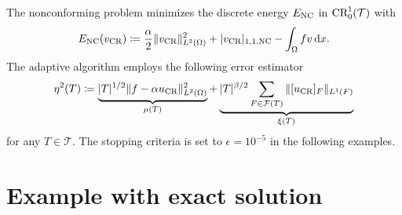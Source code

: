 \documentclass[11p]{article}
\newcommand{\CR}{\textup{CR}}
\newcommand{\NC}{\textup{NC}}
\renewcommand{\d}[1]{\ensuremath{\,\textup{d} #1}}
\begin{document}
	\noindent The nonconforming problem minimizes the discrete energy $E_\NC$ in $\CR_0^1(\mathcal{T})$ with
	\begin{align*}
		E_\NC(v_\CR) \coloneqq \frac{\alpha}{2}\|v_\CR\|^2_{L^2(\Omega)} + |v_\CR|_{1,1,\NC} - \int_{\Omega} f v \d{x}.
	\end{align*}
	The adaptive algorithm employs the following error estimator
	\begin{align*}
		\eta^2(T) \coloneqq \underbrace{|T|^{1/2}\|f - \alpha u_\CR\|^2_{L^2(\Omega)}}_{\mu(T)} + \underbrace{|T|^{\beta/2}\sum_{F \in \mathcal{F}(T)} \|[u_\CR]_F\|_{L^1(F)}}_{\xi(T)}
	\end{align*}
	for any $T \in \mathcal{T}$. The stopping criteria is set to $\epsilon = 10^{-5}$ in the following examples.
	
	\section{Example with exact solution}
\end{document}
